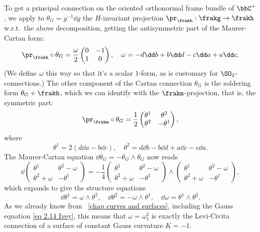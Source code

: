 \begin{example}
    To get a principal connection on the oriented orthonormal frame bundle of $\bbC^+$, we apply to $\theta_G=g^{-1}\dd g$ the $H$-invariant projection $\pr_\frakh:\frakg\to\frakh$ w.r.t.\ the above decomposition, getting the antisymmetric part of the Maurer-Cartan form: 
    \[\pr_\frakh\circ \theta_G=\frac{\omega}{2}\begin{pmatrix}
        0 & -1\\1 & 0
    \end{pmatrix},\quad \omega=-d\dd b+b\dd d-c\dd a+a\dd c.\]
    (We define $\omega$ this way so that it's a scalar $1$-form, as is customary for $\SO_2$-connections.) The other component of the Cartan connection $\theta_G$ is the soldering form $\theta_G+\frakh$, which we can identify with the $\frakm$-projection, that is, the symmetric part:
    \[\pr_\frakm\circ \theta_G=\frac12\begin{pmatrix}
        \theta^1 & \theta^2 \\
        \theta^2 & -\theta^1
    \end{pmatrix},\]
    where 
    \[\theta^1=2(d\dd a-b\dd c),\quad \theta^2=d\dd b-b\dd d+a\dd c-c\dd a.\]
    The Maurer-Cartan equation $\dd\theta_G=-\theta_G\wedge\theta_G$ now reads 
    \[\dd\begin{pmatrix}
        \theta^1 & \theta^2-\omega \\
        \theta^2+\omega & -\theta^1
    \end{pmatrix}=-\frac{1}{4}\begin{pmatrix}
        \theta^1 & \theta^2-\omega \\
        \theta^2+\omega & -\theta^1
    \end{pmatrix}\wedge \begin{pmatrix}
        \theta^1 & \theta^2-\omega \\
        \theta^2+\omega & -\theta^1
    \end{pmatrix},\]
    which expands to give the structure equations
    \[\dd\theta^1=\omega\wedge\theta^2,\quad \dd\theta^2=-\omega\wedge\theta^1,\quad \dd\omega=\theta^1\wedge\theta^2.\]
    As we already know from \Chap~\ref{chap curves and surfaces}, including the Gauss equation \eqref{eq 2.14 Ivey}, this means that $\omega=\omega^2_1$ is exactly the Levi-Civita connection of a surface of constant Gauss curvature $K=-1$.


\end{example}
